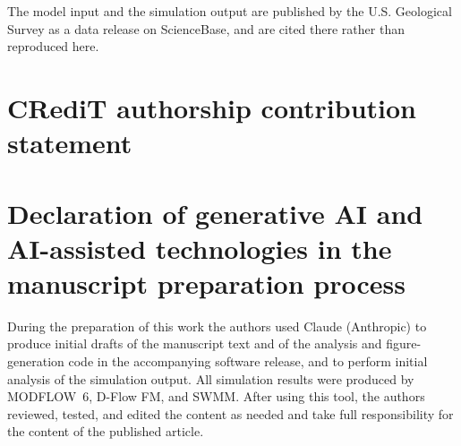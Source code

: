 \documentclass[preprint,authoryear,11pt]{elsarticle}
\begin{document}
The model input and the simulation output are published by the U.S. Geological Survey as a data release on ScienceBase, and are cited there rather than reproduced here. %


\section*{CRediT authorship contribution statement}


\section*{Declaration of generative AI and AI-assisted technologies in the manuscript preparation process}

During the preparation of this work the authors used Claude (Anthropic) to produce initial drafts of the manuscript text and of the analysis and figure-generation code in the accompanying software release, and to perform initial analysis of the simulation output. All simulation results were produced by MODFLOW~6, D-Flow FM, and SWMM. After using this tool, the authors reviewed, tested, and edited the content as needed and take full responsibility for the content of the published article.
\end{document}
